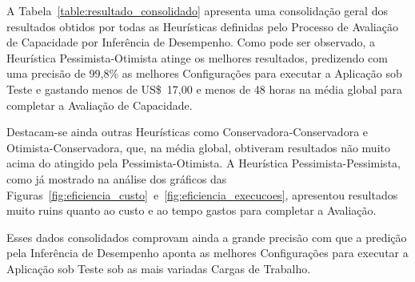 A Tabela~\ref{table:resultado_consolidado} apresenta uma consolidação geral dos
resultados obtidos por todas as Heurísticas definidas pelo Processo de Avaliação
de Capacidade por Inferência de Desempenho. Como pode ser observado, a Heurística 
Pessimista-Otimista atinge os melhores resultados, predizendo com uma precisão de 
99,8\% as melhores Configurações para executar a Aplicação sob Teste e gastando 
menos de US\$~17,00 e menos de 48 horas na média global para completar a Avaliação 
de Capacidade.  

Destacam-se ainda outras Heurísticas como Conservadora-Conservadora e 
Otimista-Conservadora, que, na média global, obtiveram resultados não muito acima
do atingido pela Pessimista-Otimista. A Heurística Pessimista-Pessimista, como
já mostrado na análise dos gráficos das 
Figuras~\ref{fig:eficiencia_custo}~e~\ref{fig:eficiencia_execucoes}, apresentou
resultados muito ruins quanto ao custo e ao tempo gastos para completar a Avaliação.

Esses dados consolidados comprovam ainda a grande precisão com que a predição
pela Inferência de Desempenho aponta as melhores Configurações para executar a
Aplicação sob Teste sob as mais variadas Cargas de Trabalho.
 



